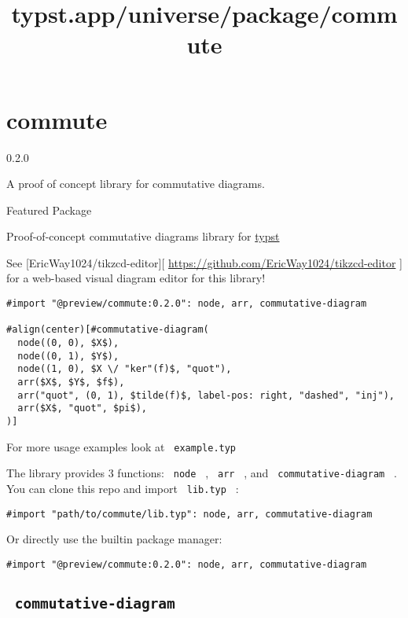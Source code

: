 \title{typst.app/universe/package/commute}

\label{banner}
\section{commute}\label{commute}

{ 0.2.0 }

A proof of concept library for commutative diagrams.

{ } Featured Package

\label{readme}
Proof-of-concept commutative diagrams library for
\href{https://typst.app/home}{typst}

See {[}EricWay1024/tikzcd-editor{]}{[}
\url{https://github.com/EricWay1024/tikzcd-editor} {]} for a web-based
visual diagram editor for this library!

\begin{verbatim}
#import "@preview/commute:0.2.0": node, arr, commutative-diagram

#align(center)[#commutative-diagram(
  node((0, 0), $X$),
  node((0, 1), $Y$),
  node((1, 0), $X \/ "ker"(f)$, "quot"),
  arr($X$, $Y$, $f$),
  arr("quot", (0, 1), $tilde(f)$, label-pos: right, "dashed", "inj"),
  arr($X$, "quot", $pi$),
)]
\end{verbatim}


For more usage examples look at \texttt{\ example.typ\ }

The library provides 3 functions: \texttt{\ node\ } , \texttt{\ arr\ } ,
and \texttt{\ commutative-diagram\ } . You can clone this repo and
import \texttt{\ lib.typ\ } :

\begin{verbatim}
#import "path/to/commute/lib.typ": node, arr, commutative-diagram
\end{verbatim}

Or directly use the builtin package manager:

\begin{verbatim}
#import "@preview/commute:0.2.0": node, arr, commutative-diagram
\end{verbatim}

\subsection{\texorpdfstring{\texttt{\ commutative-diagram\ }}{ commutative-diagram }}\label{commutative-diagram}

